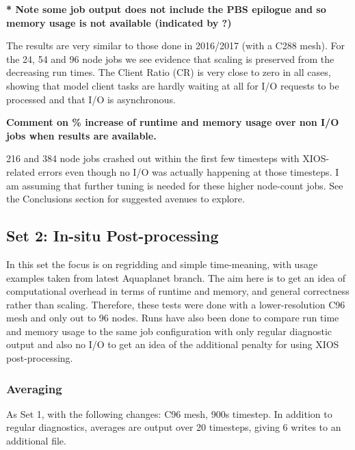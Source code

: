 \scriptsize \textbf{* Note some job output does not include the PBS epilogue and so memory usage is not available (indicated by ?)}
\newline

\normalsize
The results are very similar to those done in 2016/2017 (with a C288 mesh). For the 24, 54 and 96 node jobs we see
evidence that scaling is preserved from the decreasing run times. The Client Ratio (CR) is very close to zero in all cases, 
showing that model client tasks are hardly waiting at all for I/O requests to be processed and that I/O is asynchronous.

\textbf{Comment on \% increase of runtime and memory usage over non I/O jobs when results are available.}

216 and 384 node jobs crashed out within the first few timesteps with XIOS-related errors even though no I/O was
actually happening at those timesteps. I am assuming that further tuning is needed for these higher node-count jobs.
See the Conclusions section for suggested avenues to explore.

\subsection{Set 2: In-situ Post-processing}

In this set the focus is on regridding and simple time-meaning, with usage examples taken from latest Aquaplanet branch.
The aim here is to get an idea of computational overhead in terms of runtime and memory, and general correctness rather than scaling.
Therefore, these tests were done with a lower-resolution C96 mesh and only out to 96 nodes.
Runs have also been done to compare run time and memory usage to the same job configuration with only regular diagnostic output and also 
no I/O to get an idea of the additional penalty for using XIOS post-processing. 

\subsubsection{Averaging}

As Set 1, with the following changes: C96 mesh, 900s timestep.
In addition to regular diagnostics, averages are output over 20 timesteps, giving 6 writes to an additional file. 

